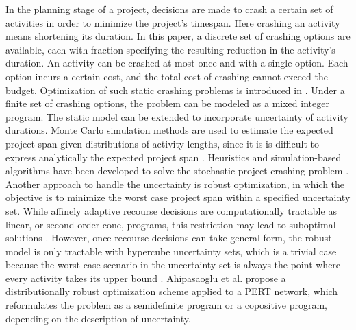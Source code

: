 \documentclass[11pt]{article}
\begin{document}
	In the planning stage of a project, decisions are made to crash a certain set of activities in order to minimize the project's timespan. Here crashing an activity means shortening its duration. In this paper, a discrete set of crashing options are available, each with fraction specifying the resulting reduction in the activity's duration. An activity can be crashed at most once and with a single option. Each option incurs a certain cost, and the total cost of crashing cannot exceed the budget. Optimization of such static crashing problems is introduced in \cite{fulkerson1961network, kelley1961criticalpath}. Under a finite set of crashing options, the problem can be modeled as a mixed integer program. The static model can be extended to incorporate uncertainty of activity durations. Monte Carlo simulation methods are used to estimate the expected project span given distributions of activity lengths, since it is is difficult to express analytically the expected project span \cite{burt1971conditional,van1963letter}. Heuristics and simulation-based algorithms have been developed to solve the stochastic project crashing problem \cite{aghaie2009ant,bowman1994stochastic,ke2014genetic,kim2007heuristic}. Another approach to handle the uncertainty is robust optimization, in which the objective is to minimize the worst case project span within a specified uncertainty set. While affinely adaptive recourse decisions are computationally tractable as linear, or second-order cone, programs, this restriction may lead to suboptimal solutions \cite{chen2008linear,cohen2007stochastic}. However, once recourse decisions can take general form, the robust model is only tractable with hypercube uncertainty sets, which is a trivial case because the worst-case scenario in the uncertainty set is always the point where every activity takes its upper bound \cite{wiesemann2012robust}. Ahipasaoglu et al. \cite{ahipasaoglu2016distributionally} propose a distributionally robust optimization scheme applied to a PERT network, which reformulates the problem as a semidefinite program or a copositive program, depending on the description of uncertainty.\\
	\newline
\end{document}
